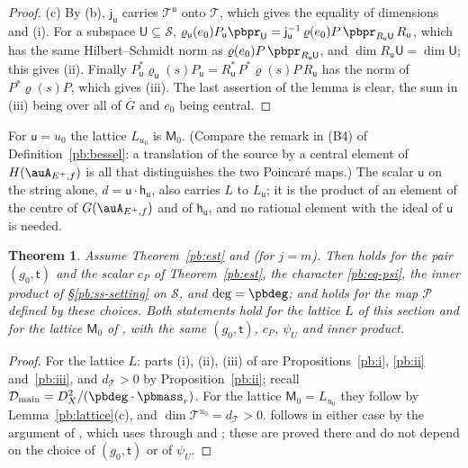 \documentclass[10pt]{amsart}
\newtheorem{theorem}{Theorem}[section]
\theoremstyle{definition}
\theoremstyle{remark}
\providecommand{\auDX}{D_X}
\providecommand{\auG}{\overline G}
\providecommand{\auP}{\mathcal P}
\providecommand{\auS}{\mathcal S}
\providecommand{\auT}{\mathcal T}
\providecommand{\audT}{d_{\auT}}
\providecommand{\pbDmain}{\mathcal D_{\mathrm{main}}}
\begin{document}
\begin{proof}
(c) By (b), $\mathsf j_{\mathsf u}$ carries $\auT^{\mathsf u}$ onto $\auT$, which gives the equality of
dimensions and (i). For a subspace $\mathsf U\subseteq\auS$, $\varrho_{\mathsf u}(e_0)P_{\mathsf u}
\pbpr_{\mathsf U}=\mathsf j_{\mathsf u}^{-1}\,\varrho(e_0)P\,\pbpr_{R_{\mathsf u}\mathsf U}\,R_{\mathsf u}$,
which has the same Hilbert--Schmidt norm as $\varrho(e_0)P\,\pbpr_{R_{\mathsf u}\mathsf U}$, and
$\dim R_{\mathsf u}\mathsf U=\dim\mathsf U$; this gives (ii). Finally $P_{\mathsf u}^*\varrho_{\mathsf u}(s)
P_{\mathsf u}=R_{\mathsf u}^*\,P^*\varrho(s)P\,R_{\mathsf u}$ has the norm of $P^*\varrho(s)P$, which gives
(iii). The last assertion of the lemma is clear, the sum in (iii) being over all of $\auG$ and
$e_0$ being central.
\end{proof}

\noindent For $\mathsf u=u_0$ the lattice $L_{u_0}$ is $\mathsf M_0$. (Compare the remark in
\textup{(B4)} of Definition~\ref{pb:bessel}: a translation of the source by a central element of
$H(\auA_{E^+,f})$ is all that distinguishes the two Poincar\'e maps.) The scalar $\mathsf u$ on the
string alone, $d=\mathsf u\cdot\mathsf h_{\mathsf u}$, also carries $L$ to $L_{\mathsf u}$; it is the product
of an element of the centre of $G(\auA_{E^+,f})$ and of $\mathsf h_{\mathsf u}$, and no rational element
with the ideal of $\mathsf u$ is needed.

\begin{theorem}\label{pb:thmB}
Assume Theorem~\ref{pb:est} and {\cite[Proposition~14.36]{P46}} (for $j=m$). Then
{\cite[Proposition~14.32]{P46}} holds for the pair $(g_0,\mathsf t)$ and the scalar $c_P$ of
Theorem~\ref{pb:est}, the character \eqref{pb:eq-psi}, the inner product of
\S\ref{pb:ss-setting} on $\auS$, and $\deg=\pbdeg$; and {\cite[Theorem~14.14]{P46}} holds for the map
$\auP$ defined by these choices. Both statements hold for the lattice $L$ of this section and
for the lattice $\mathsf M_0$ of {\cite[(35)]{P49}}, with the same $(g_0,\mathsf t)$, $c_P$,
$\psi_U$ and inner product.
\end{theorem}
\begin{proof}
For the lattice $L$: parts (i), (ii), (iii) of {\cite[Proposition~14.32]{P46}} are Propositions~\ref{pb:i}, \ref{pb:ii}
and~\ref{pb:iii}, and $\audT>0$ by Proposition~\ref{pb:ii}; recall $\pbDmain=\auDX^2/(\pbdeg\cdot
\pbmass_r)$. For the lattice $\mathsf M_0=L_{u_0}$ they follow by Lemma~\ref{pb:lattice}(c), and
$\dim\auT^{u_0}=\audT>0$. {\cite[Theorem~14.14]{P46}} follows in either case by the argument of {\cite[\S14.7]{P46}}, which uses
{\cite[Proposition~14.32]{P46}} through {\cite[Proposition~14.34]{P46}} and
{\cite[Lemmas~14.29, 14.30 and~14.31]{P46}}; these are proved there and do not
depend on the choice of $(g_0,\mathsf t)$ or of $\psi_U$.
\end{proof}
\end{document}
